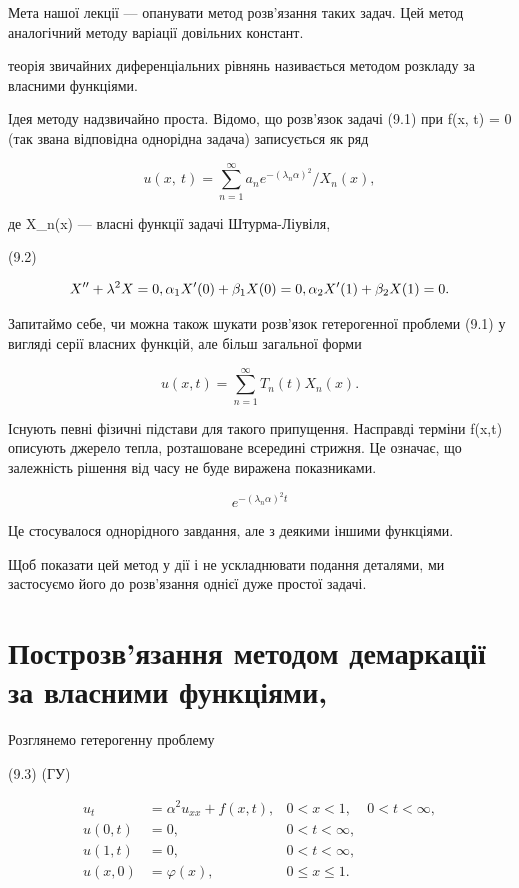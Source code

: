 \documentclass[
  ukrainian,
]{article}
\begin{document}
Мета нашої лекції --- опанувати метод розв'язання таких задач. Цей метод
аналогічний методу варіації довільних констант.

теорія звичайних диференціальних рівнянь називається методом розкладу за
власними функціями.

Ідея методу надзвичайно проста. Відомо, що розв'язок задачі (9.1) при
f(x, t) = 0 (так звана відповідна однорідна задача) записується як ряд

\[
u\left(x,\ t\right)=\sum_{n=1}^{\infty}a_{n}e^{-\left(\lambda_{n}\alpha\right)^{2}}/X_{n}\left(x\right),
\]

де X\_n(x) --- власні функції задачі Штурма-Ліувіля,

(9.2)

\[
X'' + \lambda^2 X = 0, \\ \alpha_1 X'(0) + \beta_1 X(0) = 0, \\ \alpha_2 X'(1) + \beta_2 X(1) = 0.
\]

Запитаймо себе, чи можна також шукати розв'язок гетерогенної проблеми
(9.1) у вигляді серії власних функцій, але більш загальної форми

\[
u(x, t) = \sum_{n=1}^{\infty} T_n(t) X_n(x).
\]

Існують певні фізичні підстави для такого припущення. Насправді терміни
f(x,t) описують джерело тепла, розташоване всередині стрижня. Це
означає, що залежність рішення від часу не буде виражена показниками.

\[
e^{-(\lambda_n\alpha)^2 t}
\]

Це стосувалося однорідного завдання, але з деякими іншими функціями.

Щоб показати цей метод у дії і не ускладнювати подання деталями, ми
застосуємо його до розв'язання однієї дуже простої задачі.

\section{Построзв'язання методом демаркації за власними
функціями,}\label{ux43fux43eux441ux442ux440ux43eux437ux432ux44fux437ux430ux43dux43dux44f-ux43cux435ux442ux43eux434ux43eux43c-ux434ux435ux43cux430ux440ux43aux430ux446ux456ux457-ux437ux430-ux432ux43bux430ux441ux43dux438ux43cux438-ux444ux443ux43dux43aux446ux456ux44fux43cux438}

Розглянемо гетерогенну проблему

(9.3) (ГУ)

\[
\begin{aligned} u_t &= \alpha^2 u_{xx} + f(x, t), & 0 < x < 1, & 0 < t < \infty, \\ u(0, t) &= 0, & 0 < t < \infty, \\ u(1, t) &= 0, & 0 < t < \infty, \\ u(x, 0) &= \varphi(x), & 0 \leqslant x \leqslant 1. \end{aligned}
\]
\end{document}
